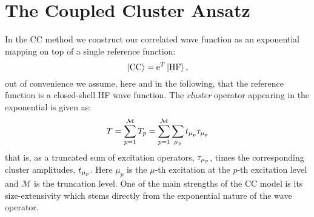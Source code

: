 \section{The Coupled Cluster Ansatz}\label{sec:coupled-cluster}

In the \acrlong*{CC} method we construct our correlated wave function as
an exponential mapping on top of a single reference
function:\autocite{Crawford2000-ey, Helgaker2000-tz, Bartlett2007-mz,
Shavitt2009-mr}
\begin{equation}
  \ket{\mathrm{CC}} = \mathrm{e}^{T}\ket{\mathrm{HF}},
\end{equation}
out of convenience we assume, here and in the following, that the
reference function is a closed-shell \acrshort{HF} wave function.
The \emph{cluster} operator appearing in the exponential is given as:
\begin{equation}
  T = \sum_{p=1}^\mathcal{M} T_p = \sum_{p=1}^\mathcal{M}\sum_{\mu_p}t_{\mu_p}\tau_{\mu_p}
\end{equation}
that is, as a truncated sum of excitation operators, $\tau_{\mu_p}$,
times the corresponding cluster amplitudes, $t_{\mu_p}$.
Here $\mu_p$ is the $\mu$-th excitation at the $p$-th excitation level and
$\mathcal{M}$ is the truncation level.
One of the main strengths of the \acrshort{CC} model is its size-extensivity
which stems directly from the exponential nature of the wave
operator.~\autocite{Shavitt2009-mr, Helgaker2000-tz}

